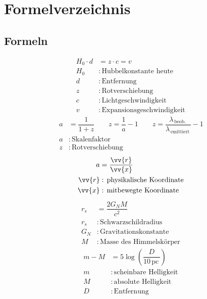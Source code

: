 \documentclass[a4paper,12pt]{article}
\numberwithin{equation}{section}
\begin{document}


\newpage


\section{Formelverzeichnis}
\subsection{Formeln}
\begin{align} 
        H_0\cdot d&=z\cdot c=v\label{eq:Hubbleentfernung}\\
        H_0&:\,\text{Hubbelkonstante heute}\,\nonumber \\
        d&:\,\text{Entfernung}\,\nonumber \\
        z&:\,\text{Rotverschiebung}\,\nonumber \\
        c&:\,\text{Lichtgeschwindigkeit}\,\nonumber \\
        v&:\,\text{Expansionsgeschwindigkeit}\,\nonumber 
\end{align} 
\begin{align} 
        a&=\dfrac{1}{1+z}\qquad z=\dfrac{1}{a}-1\qquad z=\dfrac{\lambda _{\,\text{beob.}\,}}{\lambda _{\,\text{emittiert}\,}}-1\\
        a&:\,\text{Skalenfaktor}\,\nonumber \\
        z&:\,\text{Rotverschiebung}\,\nonumber 
\end{align} 
\begin{align} 
        a&=\dfrac{\vv{r}}{\vv{x}}\\
        \vv{r}&:\,\text{physikalische Koordinate}\,\nonumber \\
        \vv{x}&:\,\text{mitbewegte Koordinate}\,\nonumber 
\end{align} 
\begin{align} 
        r_s&=\dfrac{2G_NM}{c^2}\\
        r_s&:\,\text{Schwarzschildradius}\,\nonumber \\
        G_N&:\,\text{Gravitationskonstante}\,\nonumber \\
        M&:\,\text{Masse des Himmelskörper}\,\nonumber 
\end{align} 
\begin{align} 
        m-M&=5\log\left(\dfrac{D}{10\,\text{pc}\,}\right)\\
        m&:\,\text{scheinbare Helligkeit}\,\nonumber \\
        M&:\,\text{absolute Helligkeit}\,\nonumber \\
        D&:\,\text{Entfernung}\,\nonumber 
\end{align} 
\end{document}
